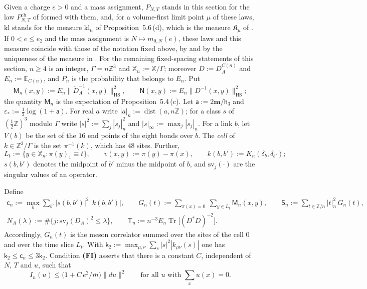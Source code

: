 \documentclass[11pt,letterpaper,reqno]{amsart}
\theoremstyle{definition}
\begin{document}
Given a charge $e>0$ and a mass assignment, $P_{N,T}$ stands in this section for the law $P^{\mathrm{ch}}_{N,T}$ of \cite[Section~1.2]{QEDII} formed with them, and, for a volume-first limit point $\mu$ of these laws, $\mathrm{kl}$ stands for the measure $\mathrm{kl}_\mu$ of Proposition~5.6\,(d), which is the measure $\mathfrak K_\mu$ of \cite[Theorem~1.4, Part~I\,(d)]{QEDII}.
If $0<e\le e_2$ and the mass assignment is $N\mapsto m_{0,N}(e)$, these laws and this measure coincide with those of the notation fixed above, by \cite[Section~I.7.5]{QEDIII} and by the uniqueness of the measure in \cite[Theorem~44\,(C7)]{QEDIII}.
For the remaining fixed-spacing statements of this section, $n\ge4$ is an integer, $\Gamma=n\mathbb Z^3$ and $\mathbb X_n:=\mathbb X/\Gamma$; moreover $D:=D^{C(n)}_A$ and $E_n:=\mathbb E_{C(n)}$, and $P_n$ is the probability that belongs to $E_n$.
Put
\begin{equation*}
\mathsf M_n(x,y):=E_n\|\check D_A^{-1}(x,y)\|^2_{\mathrm{HS}},\qquad\mathsf N(x,y):=E_n\|D^{-1}(x,y)\|^2_{\mathrm{HS}};
\end{equation*}
the quantity $\mathsf M_n$ is the expectation of Proposition~5.4\,(c).
Let $\mathsf a:=2\mathbf m/\mathsf h_3$ and $\varepsilon_*:=\frac12\log(1+\mathsf a)$.
For real $a$ write $|a|_n:=\operatorname{dist}(a,n\mathbb Z)$; for a class $s$ of $(\frac12\mathbb Z)^3$ modulo $\Gamma$ write $|s|^2:=\sum_j|s_j|_n^2$ and $|s|_\infty:=\max_j|s_j|_n$.
For a link $b$, let $V(b)$ be the set of the $16$ end points of the eight bonds over $b$.
The \emph{cell} of $k\in\mathbb Z^3/\Gamma$ is the set $\pi^{-1}(k)$, which has $48$ sites.
Further,
\begin{equation*}
L_t:=\{y\in\mathbb X_n:\pi(y)_1\equiv t\},\qquad v(x,y):=\pi(y)-\pi(x),\qquad k(b,b'):=K_n(\delta_b,\delta_{b'});
\end{equation*}
$s(b,b')$ denotes the midpoint of $b'$ minus the midpoint of $b$, and $\mathrm{sv}_j(\cdot)$ are the singular values of an operator.

Define
\begin{gather*}
\mathsf c_n:=\max_b\sum_{b'}|s(b,b')|^2\,|k(b,b')|,\qquad G_n(t):=\sum_{\pi(x)=0}\ \sum_{y\in L_t}\mathsf M_n(x,y),\qquad\mathsf S_n:=\sum_{t\in\mathbb Z/n}|t|_n^2\,G_n(t),\\
N_A(\lambda):=\#\{j:\mathrm{sv}_j(D_A)^2\le\lambda\},\qquad\mathsf T_n:=n^{-3}E_n\operatorname{Tr}\bigl[(D^*D)^{-2}\bigr].
\end{gather*}
Accordingly, $G_n(t)$ is the meson correlator summed over the sites of the cell $0$ and over the time slice $L_t$.
With $\mathsf k_2:=\max_{\mu,\nu}\sum_s|s|^2|k_{\mu\nu}(s)|$ one has $\mathsf k_2\le\mathsf c_n\le3\mathsf k_2$.
Condition \textbf{(FI)} asserts that there is a constant $C$, independent of $N$, $T$ and $u$, such that
\begin{equation*}
I_n(u)\le\bigl(1+C\,e^2/\bar m\bigr)\|du\|^2\qquad\text{for all $u$ with $\sum_xu(x)=0$.}
\end{equation*}
\end{document}
